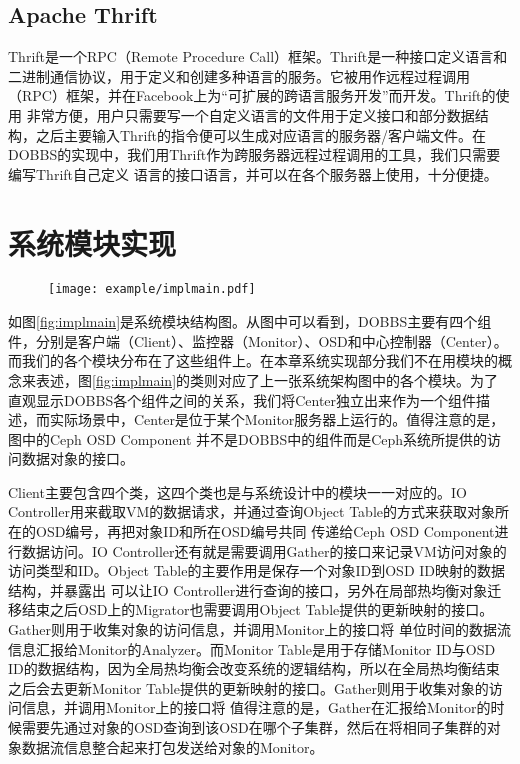 \subsection{Apache Thrift}
Thrift是一个RPC（Remote Procedure Call）框架。Thrift是一种接口定义语言和二进制通信协议，用于定义和创建多种语言的服务。它被用作远程过程调用（RPC）框架，并在Facebook上为“可扩展的跨语言服务开发”而开发。Thrift的使用
非常方便，用户只需要写一个自定义语言的文件用于定义接口和部分数据结构，之后主要输入Thrift的指令便可以生成对应语言的服务器/客户端文件。在DOBBS的实现中，我们用Thrift作为跨服务器远程过程调用的工具，我们只需要编写Thrift自己定义
语言的接口语言，并可以在各个服务器上使用，十分便捷。

\section{系统模块实现}
\begin{figure}[!htp]
    \centering
    \texttt{[image: example/implmain.pdf]}
\end{figure}

如图\ref{fig:implmain}是系统模块结构图。从图中可以看到，DOBBS主要有四个组件，分别是客户端（Client）、监控器（Monitor）、OSD和中心控制器（Center）。
而我们的各个模块分布在了这些组件上。在本章系统实现部分我们不在用模块的概念来表述，图\ref{fig:implmain}的类则对应了上一张系统架构图中的各个模块。为了
直观显示DOBBS各个组件之间的关系，我们将Center独立出来作为一个组件描述，而实际场景中，Center是位于某个Monitor服务器上运行的。值得注意的是，图中的Ceph OSD Component
并不是DOBBS中的组件而是Ceph系统所提供的访问数据对象的接口。

Client主要包含四个类，这四个类也是与系统设计中的模块一一对应的。IO Controller用来截取VM的数据请求，并通过查询Object Table的方式来获取对象所在的OSD编号，再把对象ID和所在OSD编号共同
传递给Ceph OSD Component进行数据访问。IO Controller还有就是需要调用Gather的接口来记录VM访问对象的访问类型和ID。Object Table的主要作用是保存一个对象ID到OSD ID映射的数据结构，并暴露出
可以让IO Controller进行查询的接口，另外在局部热均衡对象迁移结束之后OSD上的Migrator也需要调用Object Table提供的更新映射的接口。Gather则用于收集对象的访问信息，并调用Monitor上的接口将
单位时间的数据流信息汇报给Monitor的Analyzer。而Monitor Table是用于存储Monitor ID与OSD ID的数据结构，因为全局热均衡会改变系统的逻辑结构，所以在全局热均衡结束之后会去更新Monitor Table提供的更新映射的接口。Gather则用于收集对象的访问信息，并调用Monitor上的接口将
值得注意的是，Gather在汇报给Monitor的时候需要先通过对象的OSD查询到该OSD在哪个子集群，然后在将相同子集群的对象数据流信息整合起来打包发送给对象的Monitor。

